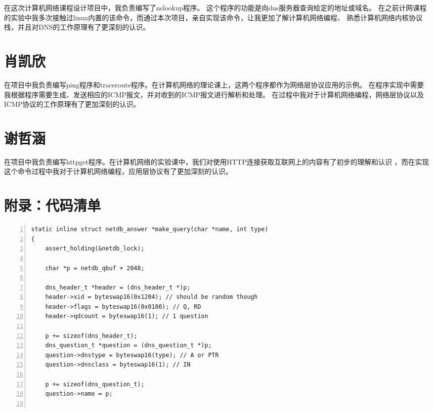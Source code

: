 \documentclass[a4paper,twoside]{ctexrep}
\begin{document}
\begin{spacing}{1.2}
在这次计算机网络课程设计项目中，我负责编写了nslookup程序。
这个程序的功能是向dns服务器查询给定的地址或域名。
在之前计网课程的实验中我多次接触过linux内置的该命令，而通过本次项目，亲自实现该命令，让我更加了解计算机网络编程、
熟悉计算机网络内核协议栈，并且对DNS的工作原理有了更深刻的认识。

\section{肖凯欣}

在项目中我负责编写ping程序和traceroute程序。在计算机网络的理论课上，这两个程序都作为网络层协议应用的示例。
在程序实现中需要我根据程序需要生成、发送相应的ICMP报文，并对收到的ICMP报文进行解析和处理。
在过程中我对于计算机网络编程，网络层协议以及ICMP协议的工作原理有了更加深刻的认识。

\section{谢哲涵}

在项目中我负责编写httpget程序。在计算机网络的实验课中，我们对使用HTTP连接获取互联网上的内容有了初步的理解和认识
，而在实现这个命令过程中我对于计算机网络编程，应用层协议有了更加深刻的认识。

\clearpage
{}




\clearpage
\section*{附录：代码清单}
\label{sec:appdixcode}

\begin{lstlisting}[numbers=left,style=CppStyle,caption={DNS报文构造},label={code:dnsquery}]
static inline struct netdb_answer *make_query(char *name, int type)
{
	assert_holding(&netdb_lock);

	char *p = netdb_qbuf + 2048;

	dns_header_t *header = (dns_header_t *)p;
	header->xid = byteswap16(0x1204); // should be random though
	header->flags = byteswap16(0x0100); // Q, RD
	header->qdcount = byteswap16(1); // 1 question

	p += sizeof(dns_header_t);
	dns_question_t *question = (dns_question_t *)p;
	question->dnstype = byteswap16(type); // A or PTR
	question->dnsclass = byteswap16(1); // IN

	p += sizeof(dns_question_t);
	question->name = p;


\end{lstlisting}
\end{spacing}
\end{document}
